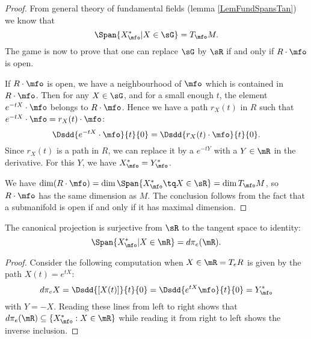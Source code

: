 \begin{proof}
From general theory of fundamental fields (lemma \ref{LemFundSpansTan}) we know that
\[
\Span\{X^*_{\mfo}|X\in\sG\}=T_{\mfo}M.
\]
The game is now to prove that one can replace $\sG$ by $\sR$ if and only if $R\cdot \mfo$ is open.

If $R\cdot\mfo$ is open, we have a neighbourhood of $\mfo$ which is contained in $R\cdot\mfo$. Then for any $X\in\sG$, and for a small enough $t$, the element $e^{-tX}\cdot\mfo$ belongs to $R\cdot\mfo$. Hence we have a path $r_X(t)$ in $R$ such that $e^{-tX}\cdot\mfo=r_X(t)\cdot\mfo$:
\[
      \Dsdd{e^{-tX}\cdot\mfo}{t}{0}=\Dsdd{r_X(t)\cdot\mfo}{t}{0}.
\]
Since $r_X(t)$ is a path in $R$, we can replace it by a $e^{-tY}$ with a $Y\in\mR$ in the derivative. For this $Y$, we have $X^*_{\mfo}=Y^*_{\mfo}$.

 We have $\dim(R\cdot\mfo)=\dim\Span\{ X^*_{\mfo}\tq X\in\sR \}=\dim T_{\mfo}M$,
so $R\cdot\mfo$ has the same dimension as $M$. The conclusion follows from the fact that a submanifold is open if and only if it has maximal dimension.

\end{proof}

\begin{lemma}
The canonical projection is surjective from $\sR$ to the tangent space to identity:
\begin{equation}\label{eq:equiv_2}
    \Span\{X^*_{\mfo}|X\in\mR\}=d\pi_e(\mR).
\end{equation}

\label{XsdpiR}

\end{lemma}

\begin{proof}
 Consider the following computation when $X\in\mR=T_eR$ is given by the path $X(t)=e^{tX}$:
\begin{equation}
  d\pi_e X=\Dsdd{[X(t)]}{t}{0}
	=\Dsdd{e^{tX}\mfo}{t}{0}
	=Y^*_{\mfo}
\end{equation}
with $Y=-X$. Reading these lines from left to right shows that $d\pi_e(\mR)\subseteq\{X^*_{\mfo}:X\in\mR\}$ while reading it from right to left shows the inverse inclusion.
\end{proof}


